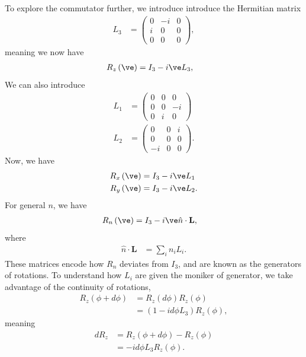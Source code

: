 \documentclass[10pt]{mypackage}
\begin{document}
{To explore the commutator further, we introduce introduce the Hermitian matrix
\begin{align*}
  L_3 &= \begin{pmatrix}0 & -i & 0 \\ i & 0 & 0 \\ 0 & 0 & 0\end{pmatrix},
\end{align*}
meaning we now have
\begin{align*}
  R_z\left(\ve\right) &= I_{3} - i\ve L_{3},
\end{align*}
We can also introduce
\begin{align*}
  L_1 &= \begin{pmatrix}0 & 0 & 0 \\ 0 & 0 & -i \\ 0 & i & 0\end{pmatrix}\\
  L_2 &= \begin{pmatrix}0 & 0 & i \\ 0 & 0 & 0 \\ -i & 0 & 0\end{pmatrix}.
\end{align*}
Now, we have
\begin{align*}
  R_x\left(\ve\right) &= I_{3} - i\ve L_{1}\\
  R_y\left(\ve\right) &= I_{3} - i\ve L_{2}.
\end{align*}
For general $n$, we have
\begin{align*}
  R_n\left(\ve\right) &= I_{3} - i\ve \hat{n}\cdot \mathbf{L},
\end{align*}
where
\begin{align*}
  \hat{n}\cdot \mathbf{L} &= \sum_{i}n_iL_{i}.
\end{align*}
These matrices encode how $R_n$ deviates from $I_{3}$, and are known as the generators of rotations.\newline
}
To understand how $L_{i}$ are given the moniker of generator, we take advantage of the continuity of rotations,
\begin{align*}
  R_z\left(\phi + d\phi\right) &= R_z\left(d\phi\right)R_z\left(\phi\right)\\
                               &= \left(1-id\phi L_{3}\right)R_{z}\left(\phi\right),
\end{align*}
meaning
\begin{align*}
  dR_z &= R_z\left(\phi + d\phi\right) - R_z\left(\phi\right)\\
       &= -id\phi L_{3}R_z\left(\phi\right).
\end{align*}
\end{document}
